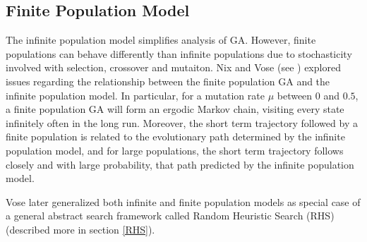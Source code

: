 \subsection{Finite Population Model}
The infinite population model simplifies analysis of GA. However, finite populations 
can behave differently than infinite populations due to stochasticity involved with selection, crossover and mutaiton. 
Nix and Vose (see \cite{Nix1992}) explored issues regarding the relationship between the finite population GA and the infinite population model. 
In particular, for a mutation rate $\mu$ between $0$ and $0.5$, a finite population GA will form an ergodic Markov chain, 
visiting every state infinitely often in the long run. 
Moreover, the short term trajectory followed by a finite population is related to 
the evolutionary path determined by the infinite population model, and  
for large populations, the short term trajectory follows closely and 
with large probability, that path predicted by 
the infinite population model. 

Vose later generalized both infinite and finite population models as special case of a 
general abstract search framework called Random Heuristic Search (RHS) (described more in section \ref{RHS}).


